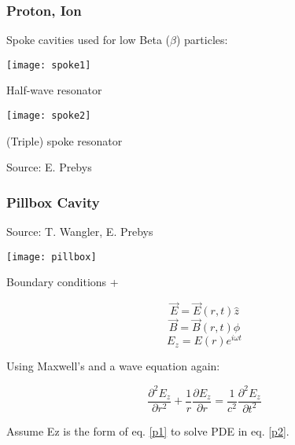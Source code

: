 \documentclass[professionalfonts,t]{beamer}
\begin{document}
\begin{frame}
\frametitle{Proton, Ion}
Spoke cavities used for low Beta ($\beta$) particles:
\vspace{0.25em}

\centering
\begin{minipage}{0.45\textwidth}
	\centering
	\texttt{[image: spoke1]}
	
	Half-wave resonator
\end{minipage}\hspace{-1em}
\begin{minipage}{0.5\textwidth}
	\centering
	\texttt{[image: spoke2]}
	
	(Triple) spoke resonator
\end{minipage}

\vspace{1em}
\hfill Source: E. Prebys
\end{frame}


\begin{frame}
\frametitle{Pillbox Cavity}
\vspace{-2em}
\hfill Source: T. Wangler, E. Prebys

\begin{minipage}{0.6\textwidth}
	\texttt{[image: pillbox]}
	
	Boundary conditions +
\end{minipage}
\begin{minipage}{0.34\textwidth}
	\begin{equation}
	\vec{E} = \vec{E}\left(r,t\right)\hat{z}
	\end{equation}
	\begin{equation}
	\vec{B} = \vec{B}\left(r,t\right)\hat{\phi}
	\end{equation}
	\begin{equation}
		E_z = E \left(r\right) e^{i \omega t} \label{p1}
	\end{equation}
\end{minipage}

Using Maxwell's and a wave equation again:

\begin{equation}
\frac{\partial^2 E_z}{\partial r^2} + \frac{1}{r} \frac{\partial E_z}{\partial r} = \frac{1}{c^2} \frac{\partial^2 E_z}{\partial t^2} \label{p2}
\end{equation}

Assume Ez is the form of eq. \ref{p1} to solve PDE in eq. \ref{p2}.  
\end{frame}
\end{document}
